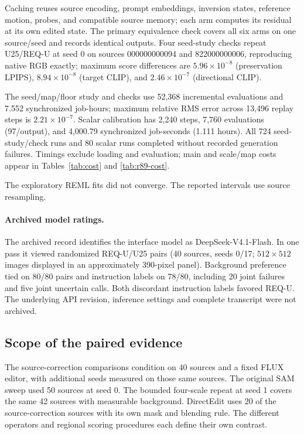 \documentclass[10pt,doubleanonymous]{ieeeconf}
\begin{document}
Caching reuses source encoding, prompt embeddings, inversion states, reference motion, probes, and compatible source memory; each arm computes its residual at its own edited state. The primary equivalence check covers all six arms on one source/seed and records identical outputs. Four seed-study checks repeat U25/REQ-U at seed 0 on sources 000000000094 and 822000000006, reproducing native RGB exactly; maximum score differences are $5.96\times10^{-8}$ (preservation LPIPS), $8.94\times10^{-8}$ (target CLIP), and $2.46\times10^{-7}$ (directional CLIP).

The seed/map/floor study and checks use 52,368 incremental evaluations and 7.552 synchronized job-hours; maximum relative RMS error across 13,496 replay steps is $2.21\times10^{-7}$. Scalar calibration has 2,240 steps, 7,760 evaluations (97/output), and 4,000.79 synchronized job-seconds (1.111 hours). All 724 seed-study/check runs and 80 scalar runs completed without recorded generation failures. Timings exclude loading and evaluation; main and scale/map costs appear in Tables~\ref{tab:cost} and \ref{tab:r89-cost}.


The exploratory REML fits did not converge. The reported intervals use source resampling.

\paragraph{Archived model ratings.}\label{sec:model-judge80}
The archived record identifies the interface model as DeepSeek-V4.1-Flash. In one pass it viewed randomized REQ-U/U25 pairs (40 sources, seeds 0/17; $512\times512$ images displayed in an approximately 390-pixel panel). Background preference tied on 80/80 pairs and instruction labels on 78/80, including 20 joint failures and five joint uncertain calls. Both discordant instruction labels favored REQ-U. The underlying API revision, inference settings and complete transcript were not archived.

\subsection{Scope of the paired evidence}
The source-correction comparisons condition on 40 sources and a fixed FLUX editor, with additional seeds measured on those same sources. The original SAM sweep used 50 sources at seed 0. The bounded four-scale repeat at seed 1 covers the same 42 sources with measurable background. DirectEdit uses 20 of the source-correction sources with its own mask and blending rule. The different operators and regional scoring procedures each define their own contrast.
\end{document}
